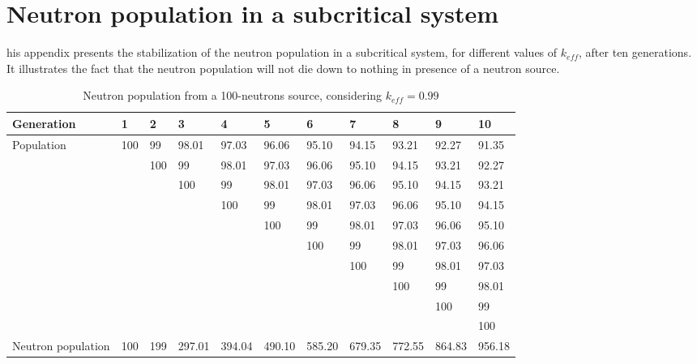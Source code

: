 %
%

\chapter{Neutron population in a subcritical system}
\label{app:app01}

his appendix presents the stabilization of the neutron population in a subcritical system, for different values of $k_{eff}$, after ten generations. It illustrates the fact that the neutron population will not die down to nothing in presence of a neutron source.

\begin{table}[!htb]
\small
    \centering
        
\begin{tabular}{lllllllllll}
Generation         & 1   & 2   & 3   & 4   & 5   & 6   & 7   & 8   & 9   & 10  \\ \hline\hline
\multirow{10}{*}{Population}         & 100 & 99  & 98.01  & 97.03  & 96.06  & 95.10  & 94.15  & 93.21  & 92.27  & 91.35  \\
                   &        & 100 & 99  & 98.01  & 97.03  & 96.06  & 95.10  & 94.15  & 93.21  & 92.27  \\
                   &        &        & 100 & 99  & 98.01  & 97.03  & 96.06  & 95.10  & 94.15  & 93.21  \\
                   &        &        &        & 100 & 99  & 98.01  & 97.03  & 96.06  & 95.10  & 94.15  \\
                   &        &        &        &        & 100 & 99  & 98.01  & 97.03  & 96.06  & 95.10  \\
                   &        &        &        &        &        & 100 & 99  & 98.01  & 97.03  & 96.06  \\
                   &        &        &        &        &        &        & 100 & 99  & 98.01  & 97.03  \\
                   &        &        &        &        &        &        &        & 100 & 99  & 98.01  \\
                   &        &        &        &        &        &        &        &        & 100 & 99  \\
                   &        &        &        &        &        &        &        &        &        & 100 \\ \hline
Neutron population & 100 & 199 & 297.01 & 394.04 & 490.10 & 585.20 & 679.35 & 772.55 & 864.83 & 956.18
\end{tabular}
        \caption{Neutron population from a 100-neutrons source, considering $k_{eff} = 0.99$}\label{tab:keff099}
\end{table}



